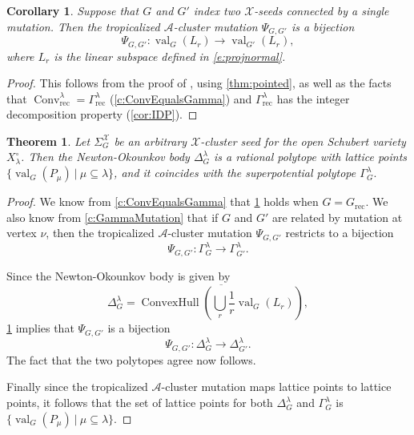 \documentclass{amsart}
\newtheorem{theorem}[thm]{Theorem}
\newtheorem{corollary}[thm]{Corollary}
\theoremstyle{definition}
\numberwithin{equation}{section}
\newcommand{\rr}{\mathbf r}
\newcommand{\conv}{\operatorname{Conv}}
\newcommand{\Q}{\Gamma}
\newcommand{\rect}{\mathrm{rec}}
\newcommand{\val}{{\operatorname{val}}}
\begin{document}
\begin{corollary}\label{cor:bijval}
Suppose that $G$ and $G'$ index two $\mathcal{X}$-seeds connected by a single mutation.
Then the tropicalized $\mathcal{A}$-cluster mutation
$\Psi_{G,G'}$ is a bijection
$$\Psi_{G,G'}: \val_G(L_r) \to \val_{G'}(L_r),$$
where $L_r$ is the linear subspace defined in 
\eqref{e:projnormal}.
\end{corollary}
\begin{proof}
This follows from  the proof of \cite[Lemma 16.16 and Lemma 16.17]{RW}, 
	using \cref{thm:pointed}, 
as well as the facts that
	$\conv_{\rect}^{\lambda}=\Q^\lambda_{\rect}$ (\cref{c:ConvEqualsGamma})
	and $\Gamma_{\rect}^{\lambda}$ has the integer decomposition property  (\cref{cor:IDP}).
\end{proof}




\begin{theorem}\label{thm:main}
Let $\Sigma_G^{\mathcal{X}}$ be an arbitrary
$\mathcal{X}$-cluster seed for the open Schubert variety $X^{\circ}_{\lambda}$.
Then
 the Newton-Okounkov body
$\Delta^{\lambda}_{G}$
is a rational polytope
with   lattice points 
$\{\val_G(P_{\mu}) \ \vert \  \mu \subseteq \lambda\}$, 
	and it coincides with 
the superpotential polytope
$\Gamma^{\lambda}_{G}.$
\end{theorem}

\begin{proof}
We know from \cref{c:ConvEqualsGamma} that \cref{thm:main}
holds when $G = G_{\rect}$.
We also know from \cref{c:GammaMutation} that 
if $G$ and $G'$ are related by mutation at vertex $\nu$,
	then the tropicalized $\mathcal{A}$-cluster mutation
	$\Psi_{G,G'}$ restricts to a bijection
	\[
\Psi_{G,G'}:
        \Q_G^\lambda %
	\to 
        \Q_{G'}^\lambda.  %
\]

Since the Newton-Okounkov body is given by 
\begin{equation*}
\Delta_G^{\lambda} =
\overline{\operatorname{ConvexHull}
\left(\bigcup_r \frac{1}{r}
\val_G(L_r)\right)}, 
\end{equation*}
\cref{cor:bijval} implies that 
	$\Psi_{G,G'}$ is a bijection 
	\[
\Psi_{G,G'}:
        \Delta_G^\lambda %
	\to 
        \Delta_{G'}^\lambda.  %
\]
The fact that the two polytopes agree now follows.

Finally since the tropicalized $\mathcal{A}$-cluster mutation
maps lattice points to lattice points, it follows that the set of lattice points for both $\Delta_G^{\lambda}$ and $\Gamma_G^{\lambda}$ is 
$\{\val_G(P_{\mu}) \ \vert \  \mu \subseteq \lambda\}$.
\end{proof}
\end{document}

